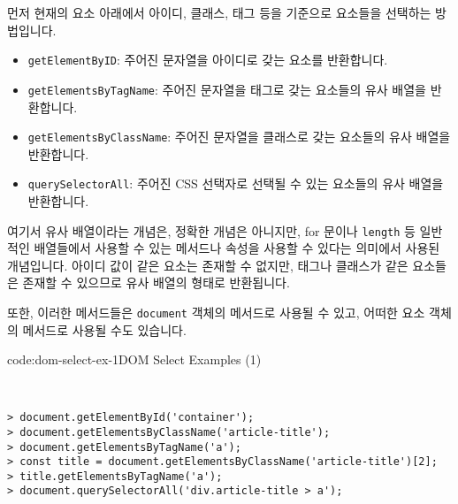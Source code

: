 먼저 현재의 요소 아래에서 아이디, 클래스, 태그 등을 기준으로 요소들을 선택하는 방법입니다. 

\begin{itemize}
    \item \texttt{getElementByID}: 주어진 문자열을 아이디로 갖는 요소를 반환합니다. 
    \item \texttt{getElementsByTagName}: 주어진 문자열을 태그로 갖는 요소들의 유사 배열을 반환합니다. 
    \item \texttt{getElementsByClassName}: 주어진 문자열을 클래스로 갖는 요소들의 유사 배열을 반환합니다. 
    \item \texttt{querySelectorAll}: 주어진 CSS 선택자로 선택될 수 있는 요소들의 유사 배열을 반환합니다. 
\end{itemize}

여기서 유사 배열이라는 개념은, 정확한 개념은 아니지만, for 문이나 \texttt{length} 등 일반적인 배열들에서 사용할 수 있는 메서드나 속성을 사용할 수 있다는 의미에서 사용된 개념입니다. 아이디 값이 같은 요소는 존재할 수 없지만, 태그나 클래스가 같은 요소들은 존재할 수 있으므로 유사 배열의 형태로 반환됩니다. 

또한, 이러한 메서드들은 \texttt{document} 객체의 메서드로 사용될 수 있고, 어떠한 요소 객체의 메서드로 사용될 수도 있습니다. 

\begin{codeenv}{code:dom-select-ex-1}{DOM Select Examples (1)}\begin{verbatim}


> document.getElementById('container');
> document.getElementsByClassName('article-title');
> document.getElementsByTagName('a');
> const title = document.getElementsByClassName('article-title')[2];
> title.getElementsByTagName('a');
> document.querySelectorAll('div.article-title > a');
\end{verbatim}
\end{codeenv}
